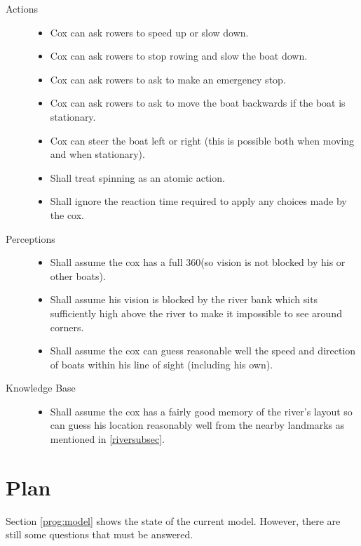   \begin{description}
    \item[Actions]
      \begin{itemize}
        \item Cox can ask rowers to speed up or slow down.
        \item Cox can ask rowers to stop rowing and slow the boat down.
        \item Cox can ask rowers to ask to make an emergency stop.
        \item Cox can ask rowers to ask to move the boat backwards if the boat is stationary.
        \item Cox can steer the boat left or right (this is possible both when moving and when stationary).
        \item Shall treat spinning as an atomic action.
        \item Shall ignore the reaction time required to apply any choices
          made by the cox.
        \end{itemize}
    \item[Perceptions]
      \begin{itemize}
        \item Shall assume the cox has a full 360\textdegree (so vision is
        not blocked by his or other boats). 
        \item Shall assume his
        vision is blocked by the river bank which sits sufficiently high
        above the river to make it impossible to see around corners.
        \item Shall assume the cox can guess reasonable well the speed and
        direction of boats within his line of sight (including his own).
        \end{itemize}
    \item[Knowledge Base]
      \begin{itemize}
        \item Shall assume the cox has a fairly good memory of the river's
          layout so can guess his location reasonably well from the nearby
          landmarks as mentioned in \ref{riversubsec}.
      \end{itemize}
  \end{description}

\section{Plan}

Section \ref{prog:model} shows the state of the current
model. However, there are still some questions that must be
answered.

